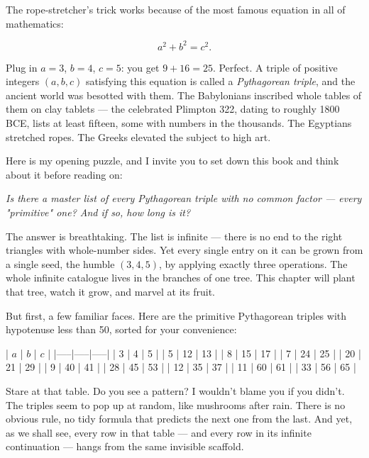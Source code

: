 \documentclass[11pt,openright,twoside]{book}
\renewenvironment{quotation}{%
  \par\vspace{8pt}%
  \begin{list}{}{%
    \setlength{\leftmargin}{2em}%
    \setlength{\rightmargin}{2em}%
  }\item[]\itshape\color{pullquote}%
}{%
  \end{list}%
  \par\vspace{8pt}%
}
\theoremstyle{definition}
\begin{document}
The rope-stretcher's trick works because of the most famous equation in all of mathematics:

\[a^2 + b^2 = c^2.\]

Plug in $a = 3$, $b = 4$, $c = 5$: you get $9 + 16 = 25$. Perfect. A triple of positive integers $(a, b, c)$ satisfying this equation is called a \textit{Pythagorean triple}, and the ancient world was besotted with them. The Babylonians inscribed whole tables of them on clay tablets --- the celebrated Plimpton 322, dating to roughly 1800 BCE, lists at least fifteen, some with numbers in the thousands. The Egyptians stretched ropes. The Greeks elevated the subject to high art.

Here is my opening puzzle, and I invite you to set down this book and think about it before reading on:

\begin{quotation}
\noindent\itshape \textit{Is there a master list of every Pythagorean triple with no common factor --- every "primitive" one? And if so, how long is it?}
\end{quotation}

The answer is breathtaking. The list is infinite --- there is no end to the right triangles with whole-number sides. Yet every single entry on it can be grown from a single seed, the humble $(3, 4, 5)$, by applying exactly three operations. The whole infinite catalogue lives in the branches of one tree. This chapter will plant that tree, watch it grow, and marvel at its fruit.

But first, a few familiar faces. Here are the primitive Pythagorean triples with hypotenuse less than 50, sorted for your convenience:

| $a$ | $b$ | $c$ |
|-----|-----|-----|
| 3   | 4   | 5   |
| 5   | 12  | 13  |
| 8   | 15  | 17  |
| 7   | 24  | 25  |
| 20  | 21  | 29  |
| 9   | 40  | 41  |
| 28  | 45  | 53  |
| 12  | 35  | 37  |
| 11  | 60  | 61  |
| 33  | 56  | 65  |

Stare at that table. Do you see a pattern? I wouldn't blame you if you didn't. The triples seem to pop up at random, like mushrooms after rain. There is no obvious rule, no tidy formula that predicts the next one from the last. And yet, as we shall see, every row in that table --- and every row in its infinite continuation --- hangs from the same invisible scaffold.


\bigskip
\end{document}
